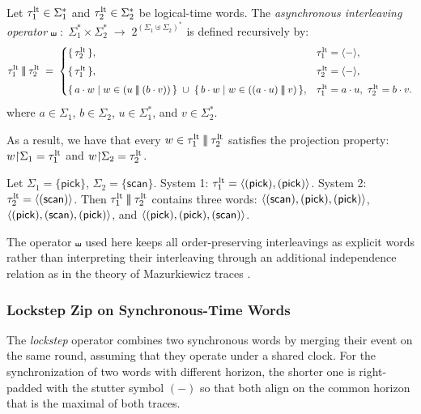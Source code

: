 \begin{definition}
  Let $\tau^{\mathrm{lt}}_1\in\Sigma_1^{*}$ and $\tau^{\mathrm{lt}}_2\in\Sigma_2^{*}$ be logical-time words. The \emph{asynchronous interleaving operator} 
  $
  \shuffle \;:\; \Sigma_1^{*}\times \Sigma_2^{*}\;\longrightarrow\; 2^{(\Sigma_1\uplus\Sigma_2)^{*}}
  $
  is defined recursively by:
  \[
  \tau^{\mathrm{lt}}_1 \mathbin{|\!|\!|} \tau^{\mathrm{lt}}_2 \;=\;
  \begin{cases}
  \{\,\tau^{\mathrm{lt}}_2\,\}, & \tau^{\mathrm{lt}}_1=\langle - \rangle ,\\[4pt]
  \{\,\tau^{\mathrm{lt}}_1\,\}, & \tau^{\mathrm{lt}}_2=\langle - \rangle ,\\[4pt]
  \{\,a\cdot w \mid w\in (u\mathbin{|\!|\!|} (b\cdot v))\,\}
  \;\cup\;
  \{\,b\cdot w \mid w\in ((a\cdot u)\mathbin{|\!|\!|} v)\,\},
  & \tau^{\mathrm{lt}}_1=a\cdot u,\ \tau^{\mathrm{lt}}_2=b\cdot v.
  \end{cases}
  \]
  where $a\in\Sigma_1$, $b\in\Sigma_2$, $u \in \Sigma_1^*$, and $v \in \Sigma_2^*$.
\end{definition}

As a result, we have that every $w\in \tau^{\mathrm{lt}}_1 \mathbin{|\!|\!|} \tau^{\mathrm{lt}}_2$ satisfies the projection property:
\( w{\upharpoonright}\Sigma_1=\tau^{\mathrm{lt}}_1 \) and \( w{\upharpoonright}\Sigma_2=\tau^{\mathrm{lt}}_2 \).

\begin{example}
  Let \(\Sigma_1=\{\textsf{pick}\}\), \(\Sigma_2=\{\textsf{scan}\}\).
  System 1: \(\tau^{\mathrm{lt}}_1=\langle (\textsf{pick}),(\textsf{pick}) \rangle \).
  System 2: \(\tau^{\mathrm{lt}}_2=\langle (\textsf{scan}) \rangle \).
  Then \(\tau^{\mathrm{lt}}_1 \mathbin{|\!|\!|} \tau^{\mathrm{lt}}_2\) contains three words:
  \( \langle (\textsf{scan}),(\textsf{pick}),(\textsf{pick}) \rangle  \),
  \( \langle (\textsf{pick}),(\textsf{scan}),(\textsf{pick}) \rangle  \), and
  \( \langle (\textsf{pick}),(\textsf{pick}),(\textsf{scan}) \rangle  \).
\end{example}

The operator \(\shuffle\) used here keeps all order-preserving interleavings as explicit words rather than interpreting their interleaving through an additional independence relation as in the theory of Mazurkiewicz traces \cite{diekert1995book,Leucker2002Logics}.

\subsubsection{Lockstep Zip on Synchronous-Time Words}

The \emph{lockstep} operator combines two synchronous words by merging their event on the same round, assuming that they operate under a shared clock.  For the synchronization of two words with different horizon, the shorter one is right-padded with the stutter symbol $(-)$ so that both align on the common horizon that is the maximal of both traces.

